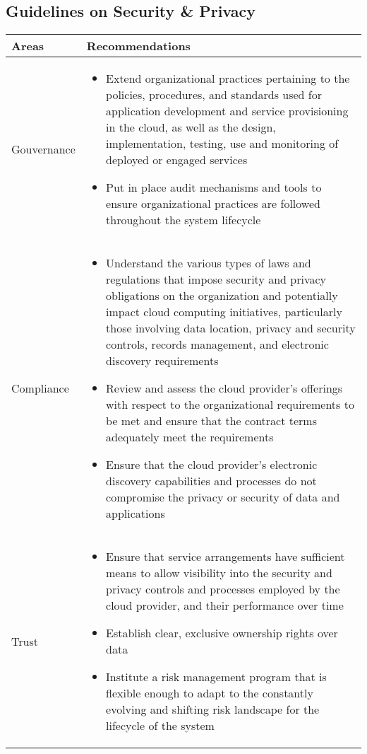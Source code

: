 \subsection{Guidelines on Security \& Privacy}
\begin{table}[h]
    \centering
    \begin{tabular}{p{3cm} | p{12cm}}
        \bfseries{Areas} & \bfseries{Recommendations}\\ \hline
        Gouvernance &
        \begin{itemize}
            \item Extend organizational practices pertaining to the policies, procedures, and standards used for application development and service provisioning in the cloud, as well as the design, implementation, testing, use and monitoring of deployed or engaged services
            \item Put in place audit mechanisms and tools to ensure organizational practices are followed throughout the system lifecycle
        \end{itemize}\\
        Compliance &
        \begin{itemize}
            \item Understand the various types of laws and regulations that impose security and privacy obligations on the organization and potentially impact cloud computing initiatives, particularly those involving data location, privacy and security controls, records management, and electronic discovery requirements
            \item Review and assess the cloud provider's offerings with respect to the organizational requirements to be met and ensure that the contract terms adequately meet the requirements
            \item Ensure that the cloud provider's electronic discovery capabilities and processes do not compromise the privacy or security of data and applications
        \end{itemize}\\
        Trust &
        \begin{itemize}
            \item Ensure that service arrangements have sufficient means to allow visibility into the security and privacy controls and processes employed by the cloud provider, and their performance over time
            \item Establish clear, exclusive ownership rights over data
            \item Institute a risk management program that is flexible enough to adapt to the constantly evolving and shifting risk landscape for the lifecycle of the system

\end{itemize}
\end{tabular}
\end{table}
